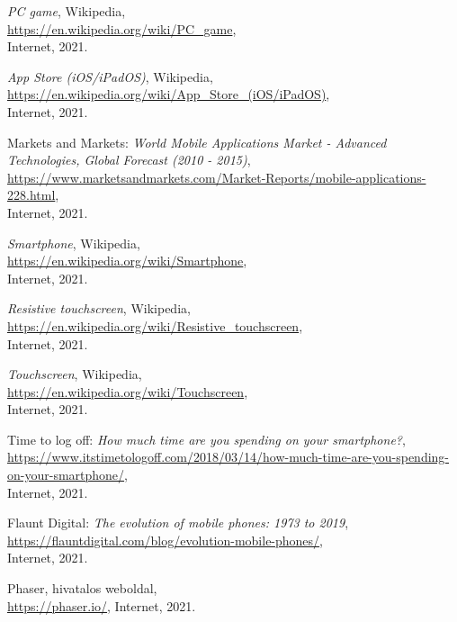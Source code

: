 \begin{thebibliography}{x}
	\emph{PC game}, Wikipedia, \\
	\url{https://en.wikipedia.org/wiki/PC_game}, \\
	Internet, 2021.
	
	\emph{App Store (iOS/iPadOS)}, Wikipedia, \\
	\url{https://en.wikipedia.org/wiki/App_Store_(iOS/iPadOS)}, \\
	Internet, 2021.
	
	Markets and Markets: \emph{World Mobile Applications Market - Advanced Technologies, Global Forecast (2010 - 2015)}, \\
	\url{https://www.marketsandmarkets.com/Market-Reports/mobile-applications-228.html}, \\
	Internet, 2021.
	
	\emph{Smartphone}, Wikipedia, \\
	\url{https://en.wikipedia.org/wiki/Smartphone}, \\
	Internet, 2021.
	
	\emph{Resistive touchscreen}, Wikipedia, \\
	\url{https://en.wikipedia.org/wiki/Resistive_touchscreen}, \\
	Internet, 2021.
	
	\emph{Touchscreen}, Wikipedia, \\
	\url{https://en.wikipedia.org/wiki/Touchscreen}, \\
	Internet, 2021.
	
	Time to log off: \emph{How much time are you spending on your smartphone?}, \\
	\url{https://www.itstimetologoff.com/2018/03/14/how-much-time-are-you-spending-on-your-smartphone/}, \\
	Internet, 2021.
	
	Flaunt Digital: \emph{The evolution of mobile phones: 1973 to 2019}, \\
	\url{https://flauntdigital.com/blog/evolution-mobile-phones/}, \\
	Internet, 2021.
	
	
	
	
	
	
	
	
	Phaser, hivatalos weboldal, \\
	\url{https://phaser.io/},
	Internet, 2021.


\end{thebibliography}

